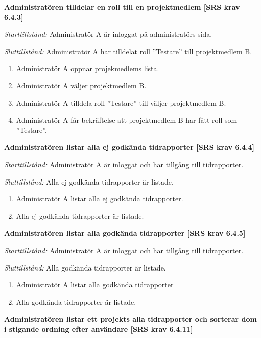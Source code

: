 \documentclass[a4paper]{article}
\begin{document}
\begin{FT}

\item %
\textbf{Administratören tilldelar en roll till en projektmedlem [SRS krav 6.4.3]}

\emph{Starttillstånd:} Administratör A är inloggat på administratörs sida.

\emph{Sluttillstånd:} Administratör A har tilldelat roll ”Testare” till projektmedlem B.

\begin{enumerate}
\item Administratör A oppnar projekmedlems lista.
\item Administratör A väljer projektmedlem B.
\item Administratör A tilldela roll  ”Testare” till väljer projektmedlem B.
\item Administratör A får bekräftelse att projektmedlem B har fått roll som ”Testare”.
\end{enumerate}

\item %
\textbf{Administratören listar alla ej godkända tidrapporter [SRS krav 6.4.4]}

\emph{Starttillstånd:} Administratör A är inloggat och har tillgång till tidrapporter.

\emph{Sluttillstånd:} Alla ej godkända tidrapporter är listade.

\begin{enumerate}
\item Administratör A listar alla ej godkända tidrapporter.
\item Alla ej godkända tidrapporter är listade.
\end{enumerate}

\item %
\textbf{Administratören listar alla godkända tidrapporter [SRS krav 6.4.5]}

\emph{Starttillstånd:}  Administratör A är inloggat och har tillgång till tidrapporter.

\emph{Sluttillstånd:} Alla godkända tidrapporter är listade.

\begin{enumerate}
\item Administratör A listar alla godkända tidrapporter
\item Alla godkända tidrapporter är listade.
\end{enumerate}

\item %
\textbf{Administratören listar ett projekts alla tidrapporter och sorterar dom i stigande ordning efter användare [SRS krav 6.4.11]}


\end{FT}
\end{document}
